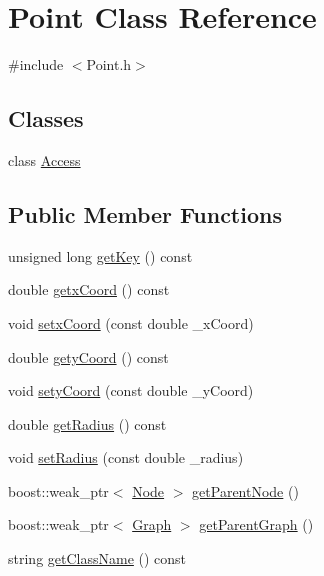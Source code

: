 \hypertarget{class_point}{}\section{Point Class Reference}
\label{class_point}


{\ttfamily \#include $<$Point.\+h$>$}

\subsection*{Classes}
\begin{DoxyCompactItemize}
\item 
class \hyperlink{class_point_1_1_access}{Access}
\end{DoxyCompactItemize}
\subsection*{Public Member Functions}
\begin{DoxyCompactItemize}
\item 
unsigned long \hyperlink{class_point_a7b58fcbd11f19bcea5b6423ab0d85411}{get\+Key} () const 
\item 
double \hyperlink{class_point_adc894b48df9aed7a596d84e0a45ae42a}{getx\+Coord} () const 
\item 
void \hyperlink{class_point_acbb501c6d6668800204fd6e46cb7ae9e}{setx\+Coord} (const double \+\_\+x\+Coord)
\item 
double \hyperlink{class_point_ad2ada2f30a1e8bb032fa555c99c1c48d}{gety\+Coord} () const 
\item 
void \hyperlink{class_point_a73d9f15f6d989bdd9b4188fba54c256d}{sety\+Coord} (const double \+\_\+y\+Coord)
\item 
double \hyperlink{class_point_a9109d60b782e753cc08bbdf4c5e6e4c7}{get\+Radius} () const 
\item 
void \hyperlink{class_point_ae0d5dea3037385cb2e69c512e279e57d}{set\+Radius} (const double \+\_\+radius)
\item 
boost\+::weak\+\_\+ptr$<$ \hyperlink{class_node}{Node} $>$ \hyperlink{class_point_afd863d4ed0ad6111bb527b682b2d3657}{get\+Parent\+Node} ()
\item 
boost\+::weak\+\_\+ptr$<$ \hyperlink{class_graph}{Graph} $>$ \hyperlink{class_point_a99a78b2c580e25d2a3785a02e0e37b65}{get\+Parent\+Graph} ()
\item 
string \hyperlink{class_point_ad46505e0de99393b14eb516caf85e339}{get\+Class\+Name} () const 
\end{DoxyCompactItemize}
